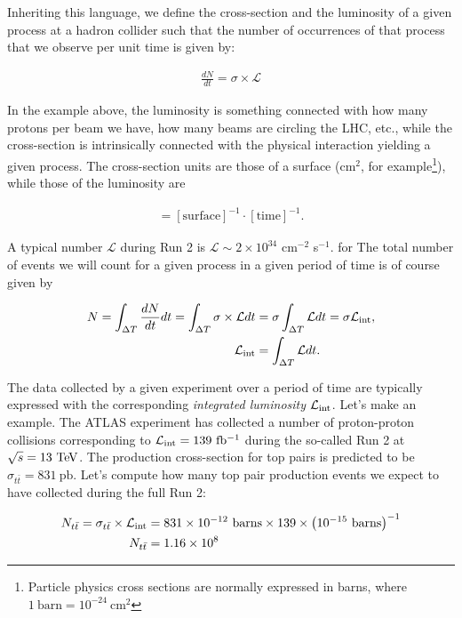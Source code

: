 Inheriting this language, we define the cross-section and the luminosity of a given process at a hadron collider such that the number of occurrences of that process that we observe per unit time is given by: 

\begin{align*}
\frac{dN}{dt} = \sigma \times \mathcal{L}
\end{align*} 

In the example above, the luminosity is something connected with how many protons per beam we have, how many beams are circling the LHC, etc., while the cross-section is intrinsically connected with the physical interaction yielding a given process. The cross-section units are those of a surface (cm$^2$, for example\footnote{Particle physics cross sections are normally expressed in barns, where $1\ \mathrm{barn} = 10^{-24}\ \mathrm{cm}^2$}), while those of the luminosity are

\begin{align*}
[\mathcal{L}] =  [\mathrm{surface}]^{-1}\cdot [\mathrm{time}]^{-1}.
\end{align*}

A typical number $\mathcal{L}$ during Run 2 is $\mathcal{L} \sim 2\times 10^{34}$ cm$^{-2}$ s$^{-1}$. for The total number of events we will count for a given process in a given period of time is of course given by 

\begin{align}
N = \int_{\Delta T} \frac{dN}{dt} dt = \int_{\Delta T} \sigma \times \mathcal{L} dt &= \sigma \int_{\Delta T} \mathcal{L} dt = \sigma \mathcal{L}_{\mathrm{int}}, \\ 
\mathcal{L}_{\mathrm{int}} &= \int_{\Delta T} \mathcal{L} dt.
\end{align}

The data collected by a given experiment over a period of time are typically expressed with the corresponding \textit{integrated luminosity} $\mathcal{L}_{\mathrm{int}}$. Let's make an example. The ATLAS experiment has collected a number of proton-proton collisions corresponding to $\Lint = 139\ \ifb$ during the so-called Run 2 at $\sqrt{s} = 13\ \text{Te\kern -0.1em V}$. The production cross-section for top pairs is predicted to be $\sigma_{t\bar{t}} = 831\ \mathrm{pb}$. Let's compute how many top pair production events we expect to have collected during the full Run 2: 

\begin{align*}
N_{t\bar{t}} = \sigma_{t\bar{t}} \times \Lint &= 831 \times 10^{-12} \ \mathrm{barns} \times 139 \times \left(10^{-15}\ \mathrm{barns}\right)^{-1} \\
N_{t\bar{t}} &= 1.16\times 10^{8}
\end{align*}

